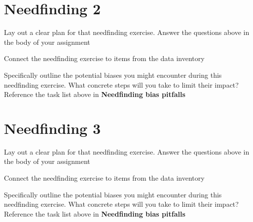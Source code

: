 \section{Needfinding 2}
Lay out a clear plan for that needfinding exercise. Answer the questions above in the body of your assignment

Connect the needfinding exercise to items from the data inventory

Specifically outline the potential biases you might encounter during this needfinding exercise. What concrete steps will you take to limit their impact? Reference the task list above in \textbf{Needfinding bias pitfalls}

\section{Needfinding 3}
Lay out a clear plan for that needfinding exercise. Answer the questions above in the body of your assignment

Connect the needfinding exercise to items from the data inventory

Specifically outline the potential biases you might encounter during this needfinding exercise. What concrete steps will you take to limit their impact? Reference the task list above in \textbf{Needfinding bias pitfalls}


